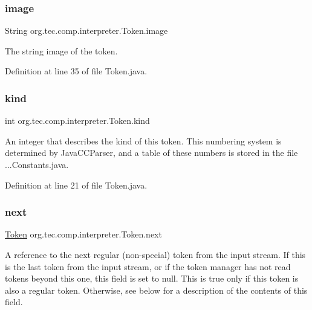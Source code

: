 \subsubsection{\texorpdfstring{image}{image}}
{\footnotesize\ttfamily String org.\+tec.\+comp.\+interpreter.\+Token.\+image}

The string image of the token. 

Definition at line 35 of file Token.\+java.

\mbox{\label{classorg_1_1tec_1_1comp_1_1interpreter_1_1_token_a94909210d1760411e4901243abdb4fc2}} 
\subsubsection{\texorpdfstring{kind}{kind}}
{\footnotesize\ttfamily int org.\+tec.\+comp.\+interpreter.\+Token.\+kind}

An integer that describes the kind of this token. This numbering system is determined by Java\+C\+C\+Parser, and a table of these numbers is stored in the file ...Constants.\+java. 

Definition at line 21 of file Token.\+java.

\mbox{\label{classorg_1_1tec_1_1comp_1_1interpreter_1_1_token_a44b635649771157f9cbc2a2481b1279a}} 
\subsubsection{\texorpdfstring{next}{next}}
{\footnotesize\ttfamily \mbox{\hyperlink{classorg_1_1tec_1_1comp_1_1interpreter_1_1_token}{Token}} org.\+tec.\+comp.\+interpreter.\+Token.\+next}

A reference to the next regular (non-\/special) token from the input stream. If this is the last token from the input stream, or if the token manager has not read tokens beyond this one, this field is set to null. This is true only if this token is also a regular token. Otherwise, see below for a description of the contents of this field. 

